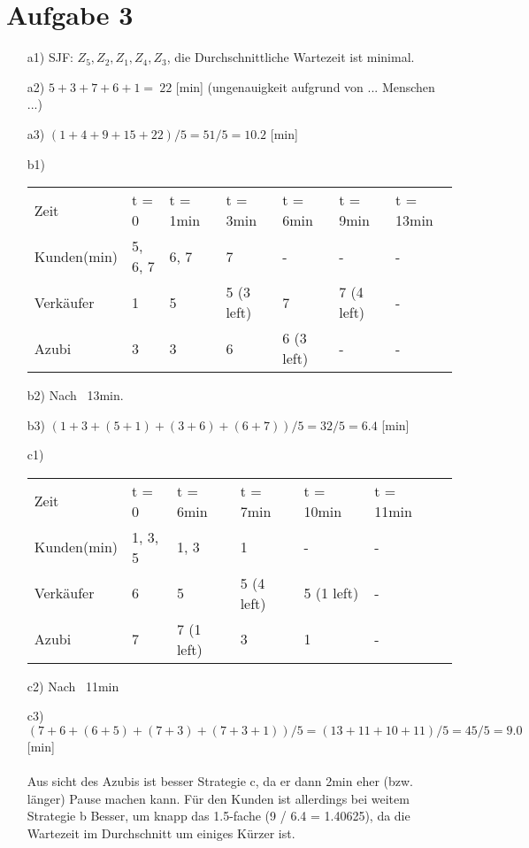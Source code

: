 \documentclass{scrartcl}
\begin{document}
\section*{Aufgabe 3}
\begin{itemize}
    \item[a1)] SJF: $Z_5, Z_2, Z_1, Z_4, Z_3$, die Durchschnittliche 
        Wartezeit ist minimal.
    \item[a2)] $5 + 3 + 7 + 6 + 1 = ~22$ [min] (ungenauigkeit aufgrund von ... Menschen ...)
    \item[a3)] $(1 + 4 + 9 + 15 + 22) / 5 = 51 / 5 = 10.2 $ [min]

    \item[b1)] \begin{tabular}{l|l|l|l|l|l|l}
            Zeit          & t = 0   & t = 1min  & t = 3min  & t = 6min  & t = 9min  & t = 13min \\
            Kunden(min)   & 5, 6, 7 & 6, 7      & 7         & -         & -         & - \\
            Verkäufer     & 1       & 5         & 5 (3 left)& 7         & 7 (4 left)& - \\
            Azubi         & 3       & 3         & 6         & 6 (3 left)& -         & - \\
        \end{tabular}
    \item[b2)] Nach ~13min.
    \item[b3)] $(1 + 3 + (5 + 1) + (3 + 6) + (6 + 7) ) / 5 = 32 / 5 = 6.4 $ [min]

    \item[c1)] \begin{tabular}{l|l|l|l|l|l|l}
            Zeit          & t = 0   & t = 6min  & t = 7min  & t = 10min & t = 11min \\
            Kunden(min)   & 1, 3, 5 & 1, 3      & 1         & -         & -         \\
            Verkäufer     & 6       & 5         & 5 (4 left)& 5 (1 left)& -         \\
            Azubi         & 7       & 7 (1 left)& 3         & 1         & -         \\
                \end{tabular}
    \item[c2)] Nach ~11min
    \item[c3)] $(7 + 6 + (6 + 5) + (7 + 3) + (7 + 3 + 1) ) / 5 = (13 + 11 + 10 + 11) / 5
        = 45 / 5 = 9.0 $ [min] \\ \\
        Aus sicht des Azubis ist besser Strategie c, da er dann 2min eher (bzw. länger)
        Pause machen kann. Für den Kunden ist allerdings bei weitem Strategie b Besser,
        um knapp das 1.5-fache (9 / 6.4 = 1.40625), da die Wartezeit im Durchschnitt
        um einiges Kürzer ist.

\end{itemize}
\end{document}

